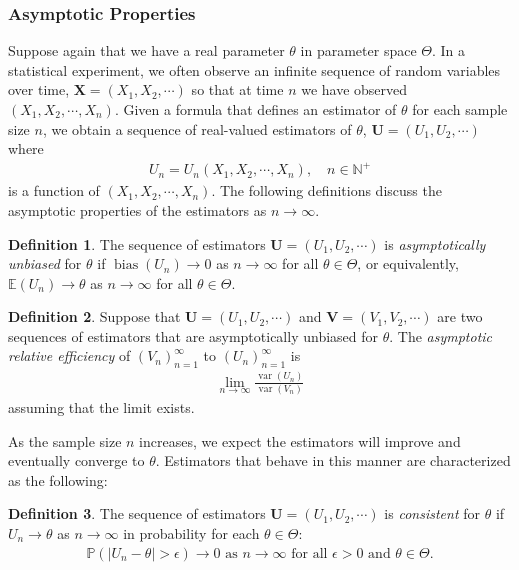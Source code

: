 \documentclass[a4paper,12pt]{article}
\theoremstyle{definition}
\theoremstyle{definition}
\theoremstyle{definition}
\newtheorem{definition}{Definition}[section]
\newcommand{\bs}{\boldsymbol}
\newcommand{\var}{\operatorname{var}}
\newcommand{\bias}{\operatorname{bias}}
\begin{document}
    \subsubsection*{Asymptotic Properties}
    Suppose again that we have a real parameter $\theta$ in parameter space $\Theta$. In a statistical experiment, we often observe an infinite sequence of random variables over time, $\bs{X} = (X_1, X_2, \cdots)$ so that at time $n$ we have observed $(X_1, X_2, \cdots, X_n)$. Given a formula that defines an estimator of $\theta$ for each sample size $n$, we obtain a sequence of real-valued estimators of $\theta$, $\bs{U} = (U_1, U_2, \cdots)$ where
    \begin{align*}
        U_n = U_n(X_1, X_2, \cdots, X_n), \quad n \in \mathbb{N}^+
    \end{align*}
    is a function of $(X_1, X_2, \cdots, X_n)$. The following definitions discuss the asymptotic properties of the estimators as $n \to \infty$. \par
    \begin{definition}
        The sequence of estimators $\bs{U} = (U_1, U_2, \cdots)$ is \textit{asymptotically unbiased} for $\theta$ if $\bias(U_n) \to 0$ as $n \to \infty$ for all $\theta \in \Theta$, or equivalently, $\mathbb{E}(U_n) \to \theta$ as $n \to \infty$ for all $\theta \in \Theta$. \par
    \end{definition}
    \begin{definition}
        Suppose that $\bs{U} = (U_1, U_2, \cdots)$ and $\bs{V} = (V_1, V_2, \cdots)$ are two sequences of estimators that are asymptotically unbiased for $\theta$. The \textit{asymptotic relative efficiency} of $(V_n)_{n = 1}^\infty$ to $(U_n)_{n = 1}^\infty$ is
        \begin{align*}
            \lim_{n \to \infty} \frac{\var(U_n)}{\var(V_n)}
        \end{align*}
        assuming that the limit exists. \par
    \end{definition}
    As the sample size $n$ increases, we expect the estimators will improve and eventually converge to $\theta$. Estimators that behave in this manner are characterized as the following: \par
    \begin{definition}
        The sequence of estimators $\bs{U} = (U_1, U_2, \cdots)$ is \textit{consistent} for $\theta$ if $U_n \to \theta$ as $n \to \infty$ in probability for each $\theta \in \Theta$:
        \begin{align*}
            \mathbb{P}(|U_n - \theta| > \epsilon) \to 0 \text{ as } n \to \infty \text{ for all } \epsilon > 0 \text{ and } \theta \in \Theta.
        \end{align*}
    \end{definition}
\end{document}
